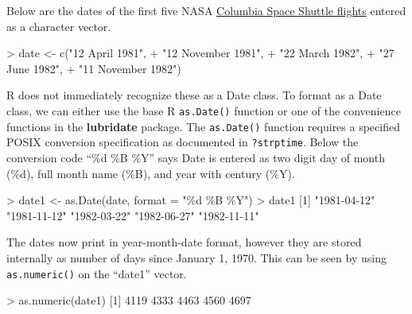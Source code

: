 \documentclass[
]{book}
\newenvironment{Shaded}{\begin{snugshade}}{\end{snugshade}}
\newcommand{\AttributeTok}[1]{\textcolor[rgb]{0.77,0.63,0.00}{#1}}
\newcommand{\DecValTok}[1]{\textcolor[rgb]{0.00,0.00,0.81}{#1}}
\newcommand{\FunctionTok}[1]{\textcolor[rgb]{0.00,0.00,0.00}{#1}}
\newcommand{\NormalTok}[1]{#1}
\newcommand{\OtherTok}[1]{\textcolor[rgb]{0.56,0.35,0.01}{#1}}
\newcommand{\SpecialCharTok}[1]{\textcolor[rgb]{0.00,0.00,0.00}{#1}}
\newcommand{\StringTok}[1]{\textcolor[rgb]{0.31,0.60,0.02}{#1}}
\begin{document}
Below are the dates of the first five NASA \href{https://en.wikipedia.org/wiki/List_of_Space_Shuttle_missions\#Shuttle_flights}{Columbia Space Shuttle flights} entered as a character vector.

\begin{Shaded}
\begin{Highlighting}[]
\SpecialCharTok{\textgreater{}}\NormalTok{ date }\OtherTok{\textless{}{-}} \FunctionTok{c}\NormalTok{(}\StringTok{"12 April 1981"}\NormalTok{, }
\SpecialCharTok{+}           \StringTok{"12 November 1981"}\NormalTok{, }
\SpecialCharTok{+}           \StringTok{"22 March 1982"}\NormalTok{, }
\SpecialCharTok{+}           \StringTok{"27 June 1982"}\NormalTok{, }
\SpecialCharTok{+}           \StringTok{"11 November 1982"}\NormalTok{)}
\end{Highlighting}
\end{Shaded}

R does not immediately recognize these as a Date class. To format as a Date class, we can either use the base R \texttt{as.Date()} function or one of the convenience functions in the \textbf{lubridate} package. The \texttt{as.Date()} function requires a specified POSIX conversion specification as documented in \texttt{?strptime}. Below the conversion code ``\%d \%B \%Y'' says Date is entered as two digit day of month (\%d), full month name (\%B), and year with century (\%Y).

\begin{Shaded}
\begin{Highlighting}[]
\SpecialCharTok{\textgreater{}}\NormalTok{ date1 }\OtherTok{\textless{}{-}} \FunctionTok{as.Date}\NormalTok{(date, }\AttributeTok{format =} \StringTok{"\%d \%B \%Y"}\NormalTok{)}
\SpecialCharTok{\textgreater{}}\NormalTok{ date1}
\NormalTok{[}\DecValTok{1}\NormalTok{] }\StringTok{"1981{-}04{-}12"} \StringTok{"1981{-}11{-}12"} \StringTok{"1982{-}03{-}22"} \StringTok{"1982{-}06{-}27"} \StringTok{"1982{-}11{-}11"}
\end{Highlighting}
\end{Shaded}

The dates now print in year-month-date format, however they are stored internally as number of days since January 1, 1970. This can be seen by using \texttt{as.numeric()} on the ``date1'' vector.

\begin{Shaded}
\begin{Highlighting}[]
\SpecialCharTok{\textgreater{}} \FunctionTok{as.numeric}\NormalTok{(date1)}
\NormalTok{[}\DecValTok{1}\NormalTok{] }\DecValTok{4119} \DecValTok{4333} \DecValTok{4463} \DecValTok{4560} \DecValTok{4697}
\end{Highlighting}
\end{Shaded}
\end{document}
